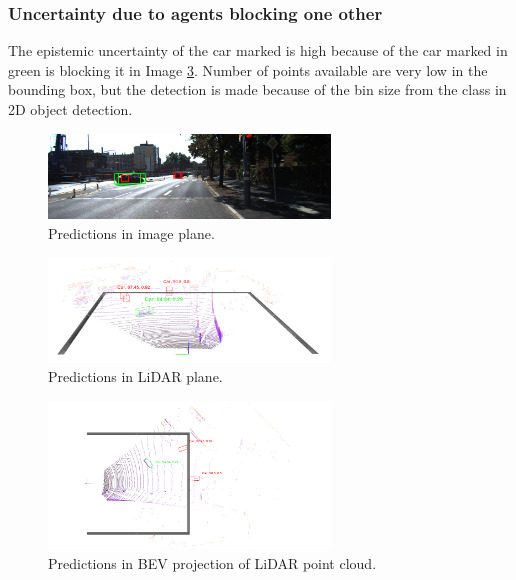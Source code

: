 \documentclass[10pt,twocolumn,letterpaper]{article}
\begin{document}
\subsubsection{Uncertainty due to agents blocking one other}
The epistemic uncertainty of the car marked is high because of the car marked in green is blocking it in Image \ref{fig:Uncert_blockage-1}. Number of points available are very low in the bounding box, but the detection is made because of the bin size from the class in 2D object detection.
\begin{figure}[!htbp]
        \centering
		\includegraphics[width=75mm, scale = 0.4]{images/Uncertainty_results/3461_overlap_bbox.png}
        \caption[Extracted frustum point cloud after Normalization]{Predictions in image plane.}
        \label{fig:Uncert_blockage-1}
\end{figure}
\begin{figure}[!htbp]
        \centering
		\includegraphics[width=75mm, scale = 0.4]{images/Uncertainty_results/3461_Follow_cam_view.png}
        \caption[Extracted frustum point cloud after Normalization]{Predictions in LiDAR plane.}
        \label{fig:Uncert_blockage-1}
\end{figure}
\begin{figure}[!htbp]
        \centering
		\includegraphics[width=75mm,scale = 0.4]{images/Uncertainty_results/3461_overlap.png}
        \caption[Extracted frustum point cloud after Normalization]{Predictions in BEV projection of LiDAR point cloud.}
        \label{fig:Uncert_blockage-1}
\end{figure}
\end{document}

